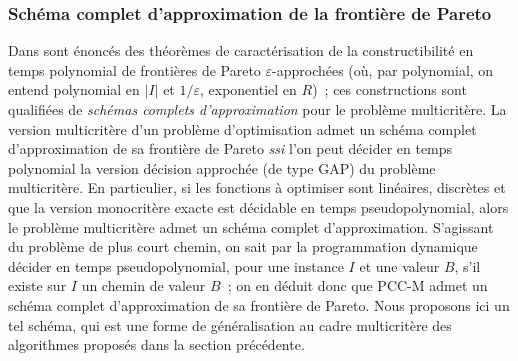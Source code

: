 \documentclass[10pt,francais]{llncs}
\begin{document}
{\subsubsection{Sch\'ema complet d'approximation de la fronti\`ere de Pareto}\label{subsub-approx-multiobj-pcc}
Dans \cite{Papadimitriou2000} sont \'enonc\'es des th\'eor\`emes de caract\'erisation de la constructibilit\'e en temps polynomial de fronti\`eres de Pareto $\varepsilon$-approch\'ees (o\`u, par polynomial, on entend polynomial en $|I|$ et $1/\varepsilon$, exponentiel en $R$)~; ces constructions sont qualifi\'ees de {\em sch\'emas complets d'approximation} pour le probl\`eme multicrit\`ere. La version multicrit\`ere d'un probl\`eme d'optimisation admet un sch\'ema complet d'approximation de sa fronti\`ere de Pareto {\em ssi} l'on peut d\'ecider en temps polynomial la version d\'ecision approch\'ee (de type GAP) du probl\`eme multicrit\`ere. En particulier, si les fonctions \`a optimiser sont lin\'eaires, discr\`etes et que la version monocrit\`ere exacte est d\'ecidable en temps pseudopolynomial, alors le probl\`eme multicrit\`ere admet un sch\'ema complet d'approximation. S'agissant du probl\`eme de plus court chemin, on sait par la programmation dynamique d\'ecider en temps pseudopolynomial, pour une instance $I$ et une valeur $B$, s'il existe sur $I$ un chemin de valeur $B$~; on en d\'eduit donc que PCC-M admet un sch\'ema complet d'approximation de sa fronti\`ere de Pareto. Nous proposons ici un tel sch\'ema, qui est une forme de g\'en\'eralisation au cadre multicrit\`ere des algorithmes propos\'es dans la section pr\'ec\'edente. 


}
\end{document}
